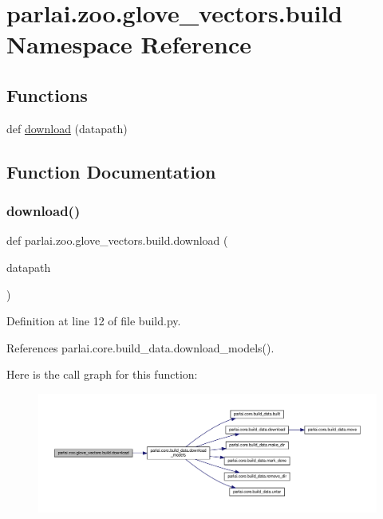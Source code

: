 \hypertarget{namespaceparlai_1_1zoo_1_1glove__vectors_1_1build}{}\section{parlai.\+zoo.\+glove\+\_\+vectors.\+build Namespace Reference}
\label{namespaceparlai_1_1zoo_1_1glove__vectors_1_1build}
\subsection*{Functions}
\begin{DoxyCompactItemize}
\item 
def \hyperlink{namespaceparlai_1_1zoo_1_1glove__vectors_1_1build_a125629618a62d8b36813296c76e9cf8b}{download} (datapath)
\end{DoxyCompactItemize}


\subsection{Function Documentation}
\mbox{\label{namespaceparlai_1_1zoo_1_1glove__vectors_1_1build_a125629618a62d8b36813296c76e9cf8b}} 
\subsubsection{\texorpdfstring{download()}{download()}}
{\footnotesize\ttfamily def parlai.\+zoo.\+glove\+\_\+vectors.\+build.\+download (\begin{DoxyParamCaption}\item[{}]{datapath }\end{DoxyParamCaption})}



Definition at line 12 of file build.\+py.



References parlai.\+core.\+build\+\_\+data.\+download\+\_\+models().

Here is the call graph for this function\+:
\nopagebreak
\begin{figure}[H]
\begin{center}
\leavevmode
\includegraphics[width=350pt]{namespaceparlai_1_1zoo_1_1glove__vectors_1_1build_a125629618a62d8b36813296c76e9cf8b_cgraph}
\end{center}
\end{figure}
